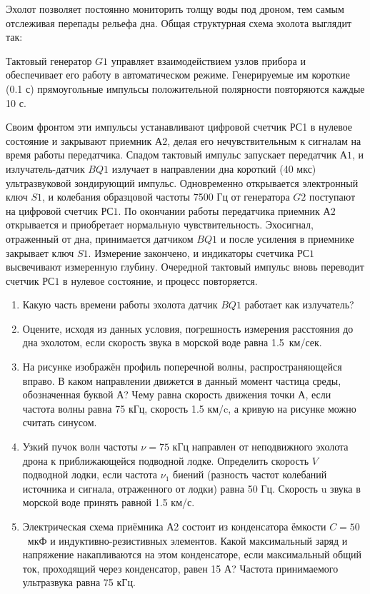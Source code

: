 
Эхолот позволяет постоянно мониторить толщу воды под дроном, тем самым отслеживая перепады рельефа дна. Общая структурная схема эхолота выглядит так:


Тактовый генератор $G1$ управляет взаимодействием узлов прибора и обеспечивает его работу в автоматическом режиме. 
Генерируемые им короткие (0.1 с) прямоугольные импульсы положительной полярности повторяются каждые 10 с.

Своим фронтом эти импульсы устанавливают цифровой счетчик РС1 в нулевое состояние и закрывают приемник $А2$, 
делая его нечувствительным к сигналам на время работы передатчика. Спадом тактовый импульс запускает передатчик 
$А1$, и излучатель-датчик $BQ1$ излучает в направлении дна короткий (40 мкс) ультразвуковой зондирующий импульс. 
Одновременно открывается электронный ключ $S1$, и колебания образцовой частоты 7500 Гц от генератора $G2$ поступают 
на цифровой счетчик $РС1$. По окончании работы передатчика приемник $А2$ открывается и приобретает нормальную 
чувствительность. Эхосигнал, отраженный от дна, принимается датчиком $BQ1$ и после усиления в приемнике 
закрывает ключ $S1$. Измерение закончено, и индикаторы счетчика $РС1$ высвечивают измеренную глубину. Очередной 
тактовый импульс вновь переводит счетчик $РС1$ в нулевое состояние, и процесс повторяется.

\begin{enumerate}
    \item Какую часть времени работы эхолота датчик $BQ1$ работает как излучатель?
    \item Оцените, исходя из данных условия, погрешность измерения расстояния до дна эхолотом, если скорость звука в морской воде равна 1.5~км/сек. 
    \item На рисунке изображён профиль поперечной волны, распространяющейся вправо. В каком направлении 
    движется в данный момент частица среды, обозначенная буквой $А$? Чему равна скорость движения точки $А$, если 
    частота волны равна 75 кГц, скорость 1.5 км/c, а кривую на рисунке можно считать синусом.
    

    \item Узкий пучок волн частоты $\nu = 75$ кГц направлен от неподвижного эхолота дрона к приближающейся подводной лодке. Определить скорость $V$ подводной лодки, если частота $\nu_1$ биений (разность частот колебаний источника и сигнала, отраженного от лодки) равна 50 Гц. Скорость u звука в морской воде принять равной 1.5 км/с.
    \item Электрическая схема приёмника А2 состоит из конденсатора ёмкости 
    \linebreak $C = 50$~мкФ и индуктивно-резистивных элементов. Какой максимальный заряд и напряжение накапливаются на этом конденсаторе, если максимальный общий ток, проходящий через конденсатор, равен 15 А? Частота принимаемого ультразвука равна 75 кГц.
    
\end{enumerate}